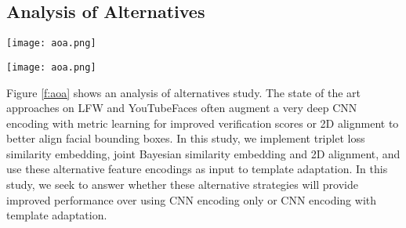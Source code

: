 \documentclass[10pt,twocolumn,letterpaper]{article}
\theoremstyle{definition}		\newtheorem{defn}[thm]{Definition}
\newcommand{\figwidth}{6.85in}
\newcommand{\ARXIV}{}
\begin{document}
\subsection{Analysis of Alternatives}
\label{ss:aoa}

\ifdefined\ECCV
\begin{figure*}[!t]
\begin{centering}
\texttt{[image: aoa.png]} 
\caption{Analysis of Alternatives. We show verification ROC curves (left) and identification CMC curves (right) for IJB-A split-1.  (top) Template adaptation compared with CNN encoding with metric learning using triplet similarity embedding \cite{Parkhi15,Schroff15} or Joint Bayesian embedding \cite{Chen12,Chen15}. (bottom) Template adaptation compared with CNN encoding and 2D alignment \cite{Taigman14,Parkhi15}.  In both cases, template adaptation outperforms all methods, and when combined with metric learning or 2D alignment, generates nearly equivalent performance.  }
\label{f:aoa}
\end{centering}
\end{figure*}
 \fi
\ifdefined\ARXIV
\begin{figure*}[!t]
\begin{centering}
\texttt{[image: aoa.png]} 
\caption{Analysis of Alternatives. We show verification ROC curves (left) and identification CMC curves (right) for IJB-A split-1.  (top) Template adaptation compared with CNN encoding with metric learning using triplet similarity embedding \cite{Parkhi15,Schroff15} or Joint Bayesian embedding \cite{Chen12,Chen15}. (bottom) Template adaptation compared with CNN encoding and 2D alignment \cite{Taigman14,Parkhi15}.  In both cases, template adaptation outperforms all methods, and when combined with metric learning or 2D alignment, generates nearly equivalent performance.  }
\label{f:aoa}
\end{centering}
\end{figure*}
 \fi



Figure \ref{f:aoa} shows an analysis of alternatives study.  The state of the art approaches on LFW and YouTubeFaces often augment a very deep CNN encoding with metric learning \cite{Schroff15,Parkhi15} for improved verification scores or 2D alignment \cite{Taigman14,Parkhi15} to better align facial bounding boxes.  In this study, we implement triplet loss similarity embedding, joint Bayesian similarity embedding and 2D alignment, and use these alternative feature encodings as input to template adaptation.  In this study, we seek to answer whether these alternative strategies will provide improved performance over using CNN encoding only or CNN encoding with template adaptation.
\end{document}

